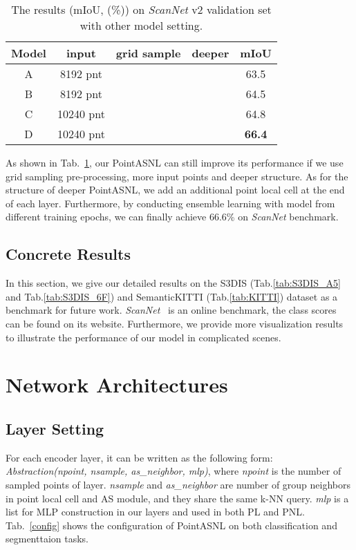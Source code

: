 \documentclass[10pt,twocolumn,letterpaper]{article}
\begin{document}
	\begin{table}[]
			\small
			\renewcommand\tabcolsep{5.5pt} 
			\begin{center}
				\caption{The results (mIoU, (\%)) on \textit{ScanNet} v2 validation set with other model setting.}
					\vspace{0.1cm}
				\begin{tabular}{c|cccc}
					\hline
					Model& input & grid sample& deeper & mIoU \\
					\hline
					\hline 
	
					A& 8192 pnt&&&  {63.5} \\	
					B& 8192 pnt&\checkmark&&  {64.5} \\
	
					C& 10240 pnt&\checkmark&&  {64.8} \\	
					D&10240 pnt&\checkmark&\checkmark & {\bf{66.4}} \\	
					\hline
				\end{tabular}
				\label{scannet_abl}
			\end{center}
			\vspace{-0.5cm}
	\end{table}
	As shown in Tab.~\ref{scannet_abl}, our PointASNL can still improve its performance if we use grid sampling pre-processing, more input points and deeper structure. As for the structure of deeper PointASNL, we add an additional point local cell at the end of each layer. Furthermore, by conducting ensemble learning with model from different training epochs, we can finally achieve 66.6\% on \textit{ScanNet} benchmark.
	
	\subsection{Concrete Results}
	In this section, we give our detailed results on the S3DIS (Tab.\ref{tab:S3DIS_A5} and Tab.\ref{tab:S3DIS_6F}) and SemanticKITTI (Tab.\ref{tab:KITTI}) dataset as a benchmark for future work. \textit{ScanNet}~\cite{scannet} is an online benchmark, the class scores can be found on its website. Furthermore, we provide more visualization results to illustrate the performance of our model in complicated scenes.
	
	
	\section{Network Architectures}
	\label{na}
	\subsection{Layer Setting}
	For each encoder layer, it can be written as the following form: \textit{Abstraction(npoint, nsample, as\_neighbor, mlp)}, where \textit{npoint} is the number of sampled points of layer. \textit{nsample} and \textit{as\_neighbor} are number of group neighbors in point local cell and AS module, and they share the same k-NN query. \textit{mlp} is a list for MLP construction in our layers and used in both PL and PNL. Tab.~\ref{config} shows the configuration of PointASNL on both classification and segmenttaion tasks.
	
\end{document}
